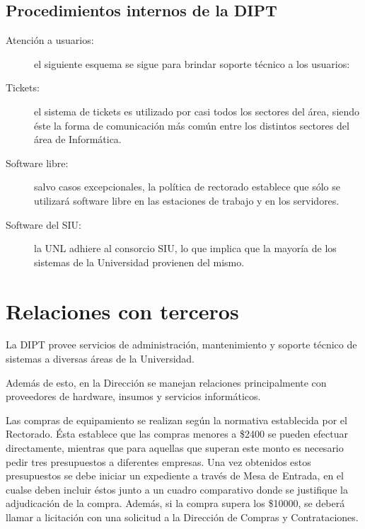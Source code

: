 \documentclass[a4paper,11pt,oneside]{article}
\begin{document}
\subsection*{Procedimientos internos de la DIPT}
%
\begin{description}
\item[Atención a usuarios:] el siguiente esquema se sigue para brindar
  soporte técnico a los usuarios:
\item[Tickets:] el sistema de tickets es utilizado por casi todos los
  sectores del área, siendo éste la forma de comunicación más
  común entre los distintos sectores del área de Informática.
\item[Software libre:] salvo casos excepcionales, la política de
  rectorado establece que sólo se utilizará software libre en las
  estaciones de trabajo y en los servidores.
\item[Software del SIU:] la UNL adhiere al consorcio SIU, lo que
  implica que la mayoría de los sistemas de la Universidad provienen
  del mismo.
\end{description}
%
\newpage
\section{Relaciones con terceros}
La DIPT provee servicios de administración, mantenimiento y soporte
técnico de sistemas a diversas áreas de la Universidad.

Además de esto, en la Dirección se manejan relaciones principalmente
con proveedores de hardware, insumos y servicios informáticos.

Las compras de equipamiento se realizan según la normativa establecida
por el Rectorado.  Ésta establece que las compras menores a \$2400 se
pueden efectuar directamente, mientras que para aquellas que superan
este monto es necesario pedir tres presupuestos a diferentes empresas.
Una vez obtenidos estos presupuestos se debe iniciar un expediente a
través de Mesa de Entrada, en el cualse deben incluir éstos junto a un
cuadro comparativo donde se justifique la adjudicación de la
compra. Además, si la compra supera los \$10000, se deberá llamar a
licitación con una solicitud a la Dirección de Compras y
Contrataciones.
%
\end{document}
